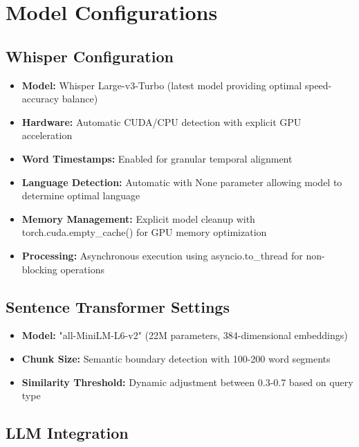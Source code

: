 \documentclass{bscs}
\begin{document}
\section{Model Configurations}

\subsection{Whisper Configuration}

\begin{itemize}
\item \textbf{Model:} Whisper Large-v3-Turbo (latest model providing optimal speed-accuracy balance)
\item \textbf{Hardware:} Automatic CUDA/CPU detection with explicit GPU acceleration
\item \textbf{Word Timestamps:} Enabled for granular temporal alignment
\item \textbf{Language Detection:} Automatic with None parameter allowing model to determine optimal language
\item \textbf{Memory Management:} Explicit model cleanup with torch.cuda.empty\_cache() for GPU memory optimization
\item \textbf{Processing:} Asynchronous execution using asyncio.to\_thread for non-blocking operations
\end{itemize}

\subsection{Sentence Transformer Settings}

\begin{itemize}
\item \textbf{Model:} "all-MiniLM-L6-v2" (22M parameters, 384-dimensional embeddings)
\item \textbf{Chunk Size:} Semantic boundary detection with 100-200 word segments
\item \textbf{Similarity Threshold:} Dynamic adjustment between 0.3-0.7 based on query type
\end{itemize}

\subsection{LLM Integration}
\end{document}
